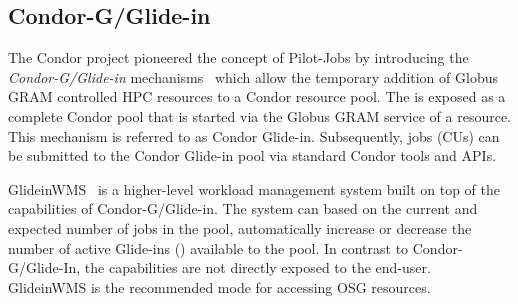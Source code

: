 \documentclass[conference]{IEEEtran}
\begin{document}
\subsection{Condor-G/Glide-in}

The Condor project pioneered the concept of Pilot-Jobs by introducing the
\textit{Condor-G/Glide-in} mechanisms~\cite{condor-g} which allow the
temporary addition of Globus GRAM controlled HPC resources to a Condor
resource pool. The \pilot is exposed as a complete Condor
pool that is started via the Globus GRAM service of a resource. This mechanism
is referred to as Condor Glide-in. Subsequently, jobs (CUs) can be submitted
to the Condor Glide-in pool via standard Condor tools and APIs.

GlideinWMS~\cite{5171374} is a higher-level workload management system built on 
top of the \pilot capabilities of Condor-G/Glide-in. The system can based on 
the current and expected number of jobs in the pool, automatically increase or 
decrease the number of active Glide-ins (\pilots) available to the pool. In 
contrast to Condor-G/Glide-In, the \pilot capabilities are not directly exposed 
to the end-user. GlideinWMS is the recommended mode for accessing OSG resources.


% 
\end{document}
